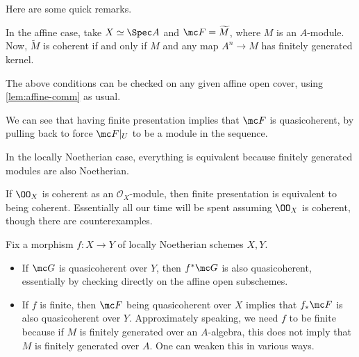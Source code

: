\documentclass[../notes.tex]{subfiles}
\begin{document}
Here are some quick remarks.
\begin{example}
	In the affine case, take $X\simeq\Spec A$ and $\mc F=\widetilde M$, where $M$ is an $A$-module. Now, $\widetilde M$ is coherent if and only if $M$ and any map $A^n\to M$ has finitely generated kernel.
\end{example}
\begin{remark}
	The above conditions can be checked on any given affine open cover, using \autoref{lem:affine-comm} as usual.
\end{remark}
\begin{remark}
	We can see that having finite presentation implies that $\mc F$ is quasicoherent, by pulling back to force $\mc F|_U$ to be a module in the sequence.
\end{remark}
\begin{remark}
	In the locally Noetherian case, everything is equivalent because finitely generated modules are also Noetherian.
\end{remark}
\begin{remark}
	If $\OO_X$ is coherent as an $\mathcal O_X$-module, then finite presentation is equivalent to being coherent. Essentially all our time will be spent assuming $\OO_X$ is coherent, though there are counterexamples.
\end{remark}
\begin{remark}
	Fix a morphism $f\colon X\to Y$ of locally Noetherian schemes $X,Y$.
	\begin{itemize}
		\item If $\mc G$ is quasicoherent over $Y$, then $f^*\mc G$ is also quasicoherent, essentially by checking directly on the affine open subschemes.
		\item If $f$ is finite, then $\mc F$ being quasicoherent over $X$ implies that $f_*\mc F$ is also quasicoherent over $Y$. Approximately speaking, we need $f$ to be finite because if $M$ is finitely generated over an $A$-algebra, this does not imply that $M$ is finitely generated over $A$. One can weaken this in various ways.
	\end{itemize}
\end{remark}
\end{document}
